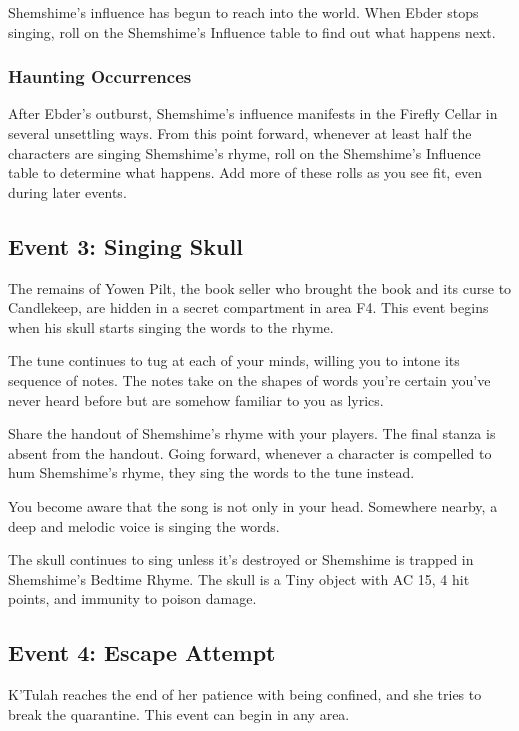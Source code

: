 \documentclass[10pt,a4paper,twoside,bg=print,twocolumn,openany,nodeprecatedcode]{dndbook}
\begin{document}
Shemshime's influence has begun to reach into the world. When Ebder stops singing, roll on the Shemshime's Influence table to find out what happens next.

\subsubsection{Haunting Occurrences}
After Ebder's outburst, Shemshime's influence manifests in the Firefly Cellar in several unsettling ways. From this point forward, whenever at least half the characters are singing Shemshime's rhyme, roll on the Shemshime's Influence table to determine what happens. Add more of these rolls as you see fit, even during later events.

\subsection{Event 3: Singing Skull}
The remains of Yowen Pilt, the book seller who brought the book and its curse to Candlekeep, are hidden in a secret compartment in area F4. This event begins when his skull starts singing the words to the rhyme.

\begin{DndReadAloud}{}
The tune continues to tug at each of your minds, willing you to intone its sequence of notes. The notes take on the shapes of words you're certain you've never heard before but are somehow familiar to you as lyrics.

\end{DndReadAloud}

Share the handout of Shemshime's rhyme with your players. The final stanza is absent from the handout. Going forward, whenever a character is compelled to hum Shemshime's rhyme, they sing the words to the tune instead.

\begin{DndReadAloud}{}
You become aware that the song is not only in your head. Somewhere nearby, a deep and melodic voice is singing the words.

\end{DndReadAloud}

The skull continues to sing unless it's destroyed or Shemshime is trapped in Shemshime's Bedtime Rhyme. The skull is a Tiny object with AC 15, 4 hit points, and immunity to poison damage.

\subsection{Event 4: Escape Attempt}
K'Tulah reaches the end of her patience with being confined, and she tries to break the quarantine. This event can begin in any area.
\end{document}
